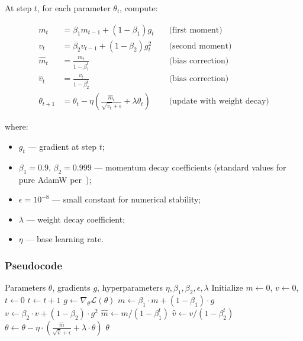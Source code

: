\documentclass[a4paper,12pt]{article}
\begin{document}
At step $t$, for each parameter $\theta_i$, compute:

\begin{align}
    m_t &= \beta_1 m_{t-1} + (1 - \beta_1) g_t \quad &\text{(first moment)} \\
    v_t &= \beta_2 v_{t-1} + (1 - \beta_2) g_t^2 \quad &\text{(second moment)} \\
    \hat{m}_t &= \frac{m_t}{1 - \beta_1^t} \quad &\text{(bias correction)} \\
    \hat{v}_t &= \frac{v_t}{1 - \beta_2^t} \quad &\text{(bias correction)} \\
    \theta_{t+1} &= \theta_t - \eta \left( \frac{\hat{m}_t}{\sqrt{\hat{v}_t} + \epsilon} + \lambda \theta_t \right) \quad &\text{(update with weight decay)}
\end{align}

where:
\begin{itemize}
    \item $g_t$ --- gradient at step $t$;
    \item $\beta_1 = 0.9$, $\beta_2 = 0.999$ --- momentum decay coefficients (standard values for pure AdamW per~\cite{loshchilov2019adamw});
    \item $\epsilon = 10^{-8}$ --- small constant for numerical stability;
    \item $\lambda$ --- weight decay coefficient;
    \item $\eta$ --- base learning rate.
\end{itemize}

\subsubsection{Pseudocode}

\begin{algorithm}[H]
\caption{AdamW}
\label{alg:adamw}
\begin{algorithmic}[1]
\Require Parameters $\theta$, gradients $g$, hyperparameters $\eta, \beta_1, \beta_2, \epsilon, \lambda$
\State Initialize $m \gets 0$, $v \gets 0$, $t \gets 0$
    \State $t \gets t + 1$
    \State $g \gets \nabla_\theta \mathcal{L}(\theta)$ 
    \State $m \gets \beta_1 \cdot m + (1 - \beta_1) \cdot g$
    \State $v \gets \beta_2 \cdot v + (1 - \beta_2) \cdot g^2$
    \State $\hat{m} \gets m / (1 - \beta_1^t)$
    \State $\hat{v} \gets v / (1 - \beta_2^t)$
    \State $\theta \gets \theta - \eta \cdot \left( \frac{\hat{m}}{\sqrt{\hat{v}} + \epsilon} + \lambda \cdot \theta \right)$
\EndWhile
\State \Return $\theta$
\end{algorithmic}
\end{algorithm}
\end{document}
